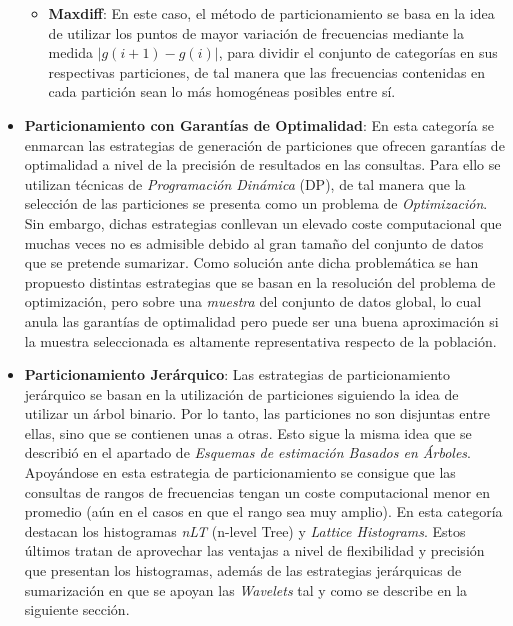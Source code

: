 \documentclass{subfiles}
\begin{document}
\begin{itemize}
\begin{itemize}
              \item \textbf{Maxdiff}: En este caso, el método de particionamiento se basa en la idea de utilizar los puntos de mayor variación de frecuencias mediante la medida $|g(i+1) - g(i)|$, para dividir el conjunto de categorías en sus respectivas particiones, de tal manera que las frecuencias contenidas en cada partición sean lo más homogéneas posibles entre sí.

            \end{itemize}
          \item \textbf{Particionamiento con Garantías de Optimalidad}: En esta categoría se enmarcan las estrategias de generación de particiones que ofrecen garantías de optimalidad a nivel de la precisión de resultados en las consultas. Para ello se utilizan técnicas de \emph{Programación Dinámica} (DP), de tal manera que la selección de las particiones se presenta como un problema de \emph{Optimización}. Sin embargo, dichas estrategias conllevan un elevado coste computacional que muchas veces no es admisible debido al gran tamaño del conjunto de datos que se pretende sumarizar. Como solución ante dicha problemática se han propuesto distintas estrategias que se basan en la resolución del problema de optimización, pero sobre una \emph{muestra} del conjunto de datos global, lo cual anula las garantías de optimalidad pero puede ser una buena aproximación si la muestra seleccionada es altamente representativa respecto de la población.

          \item \textbf{Particionamiento Jerárquico}: Las estrategias de particionamiento jerárquico se basan en la utilización de particiones siguiendo la idea de utilizar un árbol binario. Por lo tanto, las particiones no son disjuntas entre ellas, sino que se contienen unas a otras. Esto sigue la misma idea que se describió en el apartado de \emph{Esquemas de estimación Basados en Árboles}. Apoyándose en esta estrategia de particionamiento se consigue que las consultas de rangos de frecuencias tengan un coste computacional menor en promedio (aún en el casos en que el rango sea muy amplio). En esta categoría destacan los histogramas \emph{nLT} (n-level Tree) y \emph{Lattice Histograms}. Estos últimos tratan de aprovechar las ventajas a nivel de flexibilidad y precisión que presentan los histogramas, además de las estrategias jerárquicas de sumarización en que se apoyan las \emph{Wavelets} tal y como se describe en la siguiente sección.

        \end{itemize}
\end{document}
